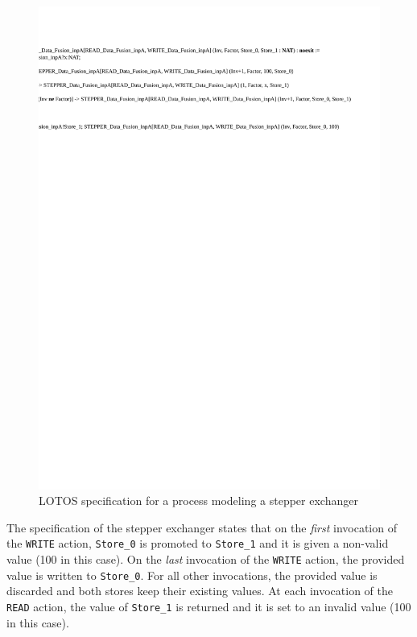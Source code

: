 \begin{figure}
\centering
\includegraphics[angle=90, scale=0.70]{figs/stepper_code}
\caption{LOTOS specification for a process modeling a stepper
  exchanger}
\label{fig:lotos_stepper}
\end{figure}

The specification of the stepper exchanger states that on the
\emph{first} invocation of the \texttt{WRITE} action,
\texttt{Store\_0} is promoted to \texttt{Store\_1} and it is given a
non-valid value (100 in this case). On the \emph{last} invocation of
the \texttt{WRITE} action, the provided value is written to
\texttt{Store\_0}. For all other invocations, the provided value is
discarded and both stores keep their existing values. At each
invocation of the \texttt{READ} action, the value of \texttt{Store\_1}
is returned and it is set to an invalid value (100 in this case).

